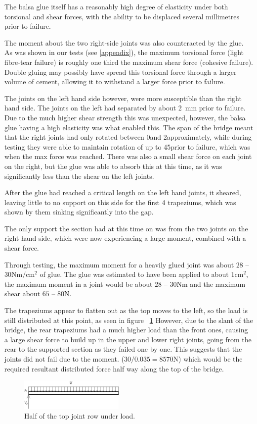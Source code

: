 \documentclass[12pt]{article}
\begin{document}
The balsa glue itself has a reasonably high degree of elasticity under both torsional and shear forces, with the ability to be displaced several millimetres prior to failure. 

The moment about the two right-side joints was also counteracted by the glue. As was shown in our tests (see \ref{appendix}), the maximum torsional force (light fibre-tear failure) is roughly one third the maximum shear force (cohesive failure). Double gluing may possibly have spread this torsional force through a larger volume of cement, allowing it to withstand a larger force prior to failure. 

The joints on the left hand side however, were more susceptible than the right hand side. The joints on the left had separated by about 2~mm prior to failure. Due to the much higher shear strength this was unexpected, however, the balsa glue having a high elasticity was what enabled this. The span of the bridge meant that the right joints had only rotated between 0\textdegree and 2\textdegree approximately, while during testing they were able to maintain rotation of up to 45\textdegree prior to failure, which was when the max force was reached. There was also a small shear force on each joint on the right, but the glue was able to absorb this at this time, as it was significantly less than the shear on the left joints.

After the glue had reached a critical length on the left hand joints, it sheared, leaving little to no support on this side for the first 4 trapeziums, which was shown by them sinking significantly into the gap.

The only support the section had at this time on was from the two joints on the right hand side, which were now experiencing a large moment, combined with a shear force. 

Through testing, the maximum moment for a heavily glued joint was about $28$ -- $30\mathrm{Nm/cm^2}$ of glue. The glue was estimated to have been applied to about $1\mathrm{cm^2}$, the maximum moment in a joint would be about $28$ -- $30\mathrm{Nm}$ and the maximum shear about $65$ -- $80\mathrm{N}$. 

The trapeziums appear to flatten out as the top moves to the left, so the load is still distributed at this point, as seen in figure ~\ref{loadtop} However, due to the slant of the bridge, the rear trapeziums had a much higher load than the front ones, causing a large shear force to build up in the upper and lower right joints, going from the rear to the supported section as they failed one by one. This suggests that the joints did not fail due to the moment. ($30 / 0.035 = 8570\mathrm{N}$) which would be the required resultant distributed force half way along the top of the bridge. 
 			\begin{figure}[h!]
				\centering
				\includegraphics[width=0.45\textwidth]{loadtop}
				\caption{Half of the top joint row under load.}
				\label{loadtop}
				\end{figure}
\end{document}
